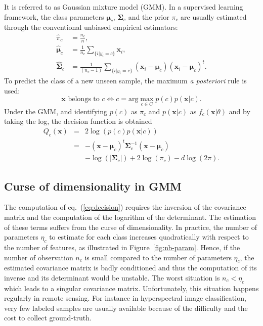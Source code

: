 \documentclass[journal,10pt]{IEEEtran}
\begin{document}
    It  is  referred  to  as  Gaussian  mixture  model  (GMM).   In  a
    supervised    learning    framework,    the    class    parameters
    $\boldsymbol{\mu}_c$,   $\boldsymbol{\Sigma}_c$   and  the   prior
    $\pi_c$ are  usually estimated  through the  conventional unbiased
    empirical estimators:
    \begin{align}
        \hat{\pi}_c &= \frac{n_c}{n},\\
        \hat{\boldsymbol{\mu}}_c &= \frac{1}{n_c} \sum_{\{i|y_i = c\}} \mathbf{x}_i ,\\
        \hat{\boldsymbol{\Sigma}}_c &= \frac{1}{(n_c - 1)} \sum_{\{i|y_i = c\}} (\mathbf{x}_i - \boldsymbol{\mu}_c) (\mathbf{x}_i - \boldsymbol{\mu}_c)^t.
    \end{align}
    To predict the  class of a new unseen sample,  the maximum \emph{a
      posteriori}  rule  is  used:
    \begin{equation*}
        \mathbf{x} \text{ belongs to } c \Leftrightarrow c = \text{arg} \max_{c \in C} p(c) p(\mathbf{x}|c).
    \end{equation*}
    Under the GMM,  and identifying $p(c)$ as $\pi_c$  and $p(\mathbf{x}|c)$ as
    $f_c(\mathbf{x}|\theta)$ and by taking the log, the decision function is obtained
    \begin{eqnarray}\label{eq:decision}
      Q_c(\mathbf{x}) &=& 2 \log \left( p(c) p(\mathbf{x}|c) \right) \nonumber \\
                      &=& - (\mathbf{x} - \boldsymbol{\mu}_c)^t \boldsymbol{\Sigma}_c^{-1} (\mathbf{x} - \boldsymbol{\mu}_c) \nonumber \\
                      & &-\log (|\boldsymbol{\Sigma}_c|) + 2 \log (\pi_c) - d \log (2\pi).
    \end{eqnarray}

    \subsection{Curse of dimensionality in GMM}
    \label{sec:curse:gmm}

    The computation of  eq.~(\ref{eq:decision}) requires the inversion
    of the covariance  matrix and the computation of  the logarithm of
    the determinant.  The  estimation of these terms  suffers from the
    curse of dimensionality\cite{bouveyron2014model}. In practice, the
    number of parameters $\eta_c$ to estimate for each class increases
    quadratically  with   respect  to  the  number   of  features,  as
    illustrated in Figure~\ref{fig:nb-param}.  Hence, if the number of
    observation $n_c$  is small compared  to the number  of parameters
    $\eta_c$, the estimated covariance matrix is badly conditioned and
    thus the computation  of its inverse and its  determinant would be
    unstable.  The  worst situation is  $n_c<\eta_c$ which leads  to a
    singular covariance matrix.  Unfortunately, this situation happens
    regularly in remote sensing.   For instance in hyperspectral image
    classification,  very few  labeled samples  are usually  available
    because of the difficulty and the cost to collect ground-truth.
\end{document}
